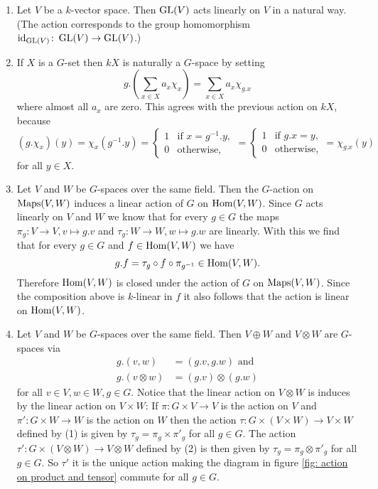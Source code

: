 \begin{expls}
  \begin{enumerate}[label=\emph{\alph*)},leftmargin=*]
    \item
      Let $V$ be a $k$-vector space. Then $\operatorname{GL}(V)$ acts linearly on $V$ in a natural way. (The action corresponds to the group homomorphism $\operatorname{id}_{\operatorname{GL}(V)} \colon \operatorname{GL}(V) \to \operatorname{GL}(V)$.)
    \item
      If $X$ is a $G$-set then $kX$ is naturally a $G$-space by setting
      \[
        g.\left(\sum_{x \in X} a_x \chi_x\right) = \sum_{x \in X} a_x \chi_{g.x}
      \]
      where almost all $a_x$ are zero. This agrees with the previous action on $kX$, because
      \[
        (g.\chi_x)(y)
        = \chi_x(g^{-1}.y)
        = \begin{cases} 1 & \text{if } x = g^{-1}.y, \\ 0 & \text{otherwise}, \end{cases}
        = \begin{cases} 1 & \text{if } g.x = y, \\ 0 & \text{otherwise}, \end{cases}
        = \chi_{g.x}(y)
      \]
      for all $y \in X$.
    \item
      Let $V$ and $W$ be $G$-spaces over the same field. Then the $G$-action on $\operatorname{Maps}(V,W)$ induces a linear action of $G$ on $\operatorname{Hom}(V,W)$. Since $G$ acts linearly on $V$ and $W$ we know that for every $g \in G$ the maps $\pi_g \colon V \to V, v \mapsto g.v$ and $\tau_g \colon W \to W, w \mapsto g.w$ are linearly. With this we find that for every $g \in G$ and $f \in \operatorname{Hom}(V,W)$ we have
      \[
        g.f = \tau_g \circ f \circ \pi_{g^{-1}} \in \operatorname{Hom}(V,W).
      \]
      Therefore $\operatorname{Hom}(V,W)$ is closed under the action of $G$ on $\operatorname{Maps}(V,W)$. Since the composition above is $k$-linear in $f$ it also follows that the action is linear on $\operatorname{Hom}(V,W)$.
    \item
      Let $V$ and $W$ be $G$-spaces over the same field. Then $V \oplus W$ and $V \otimes W$ are $G$-spaces via
      \begin{align*}
        g.(v,w) &= (g.v,g.w) \text{ and }  \tag{1} \\
        g.(v \otimes w) &= (g.v) \otimes (g.w) \tag{2}
      \end{align*}
      for all $v \in V, w \in W, g \in G$. 
      Notice that the linear action on $V \otimes W$ is induces by the linear action on $V \times W$: If $\pi \colon G \times V \to V$ is the action on $V$ and $\pi' \colon G \times W \to W$ is the action on $W$ then the action $\tau \colon G \times (V \times W) \to V \times W$ defined by (1) is given by $\tau_g = \pi_g \times \pi'_g$ for all $g \in G$. The action $\tau' \colon G \times (V \otimes W) \to V \otimes W$ defined by (2) is then given by $\tau_g = \pi_g \otimes \pi'_g$ for all $g \in G$. So $\tau'$ it is the unique action making the diagram in figure \ref{fig: action on product and tensor} commute for all $g \in G$.

\end{enumerate}
\end{expls}
